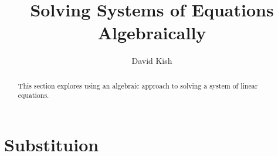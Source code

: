 \documentclass[nooutcomes]{ximera}
\author{David Kish}
\title{Solving Systems of Equations Algebraically}
\begin{document}
\begin{abstract}
This section explores using an algebraic approach to solving a system of linear equations.
\end{abstract}
\maketitle




\section{Substituion}
\end{document}
